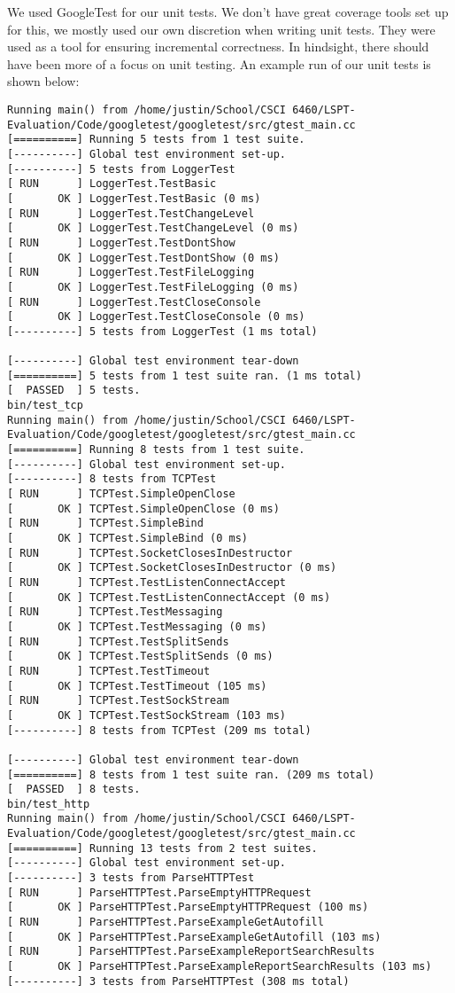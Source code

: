 We used GoogleTest for our unit tests. We don't have great coverage tools set up for this, we mostly used our own discretion when writing unit tests. They were used as a tool for ensuring incremental correctness. In hindsight, there should have been more of a focus on unit testing. An example run of our unit tests is shown below:

\footnotesize

\begin{verbatim}
Running main() from /home/justin/School/CSCI 6460/LSPT-Evaluation/Code/googletest/googletest/src/gtest_main.cc
[==========] Running 5 tests from 1 test suite.
[----------] Global test environment set-up.
[----------] 5 tests from LoggerTest
[ RUN      ] LoggerTest.TestBasic
[       OK ] LoggerTest.TestBasic (0 ms)
[ RUN      ] LoggerTest.TestChangeLevel
[       OK ] LoggerTest.TestChangeLevel (0 ms)
[ RUN      ] LoggerTest.TestDontShow
[       OK ] LoggerTest.TestDontShow (0 ms)
[ RUN      ] LoggerTest.TestFileLogging
[       OK ] LoggerTest.TestFileLogging (0 ms)
[ RUN      ] LoggerTest.TestCloseConsole
[       OK ] LoggerTest.TestCloseConsole (0 ms)
[----------] 5 tests from LoggerTest (1 ms total)

[----------] Global test environment tear-down
[==========] 5 tests from 1 test suite ran. (1 ms total)
[  PASSED  ] 5 tests.
bin/test_tcp
Running main() from /home/justin/School/CSCI 6460/LSPT-Evaluation/Code/googletest/googletest/src/gtest_main.cc
[==========] Running 8 tests from 1 test suite.
[----------] Global test environment set-up.
[----------] 8 tests from TCPTest
[ RUN      ] TCPTest.SimpleOpenClose
[       OK ] TCPTest.SimpleOpenClose (0 ms)
[ RUN      ] TCPTest.SimpleBind
[       OK ] TCPTest.SimpleBind (0 ms)
[ RUN      ] TCPTest.SocketClosesInDestructor
[       OK ] TCPTest.SocketClosesInDestructor (0 ms)
[ RUN      ] TCPTest.TestListenConnectAccept
[       OK ] TCPTest.TestListenConnectAccept (0 ms)
[ RUN      ] TCPTest.TestMessaging
[       OK ] TCPTest.TestMessaging (0 ms)
[ RUN      ] TCPTest.TestSplitSends
[       OK ] TCPTest.TestSplitSends (0 ms)
[ RUN      ] TCPTest.TestTimeout
[       OK ] TCPTest.TestTimeout (105 ms)
[ RUN      ] TCPTest.TestSockStream
[       OK ] TCPTest.TestSockStream (103 ms)
[----------] 8 tests from TCPTest (209 ms total)

[----------] Global test environment tear-down
[==========] 8 tests from 1 test suite ran. (209 ms total)
[  PASSED  ] 8 tests.
bin/test_http
Running main() from /home/justin/School/CSCI 6460/LSPT-Evaluation/Code/googletest/googletest/src/gtest_main.cc
[==========] Running 13 tests from 2 test suites.
[----------] Global test environment set-up.
[----------] 3 tests from ParseHTTPTest
[ RUN      ] ParseHTTPTest.ParseEmptyHTTPRequest
[       OK ] ParseHTTPTest.ParseEmptyHTTPRequest (100 ms)
[ RUN      ] ParseHTTPTest.ParseExampleGetAutofill
[       OK ] ParseHTTPTest.ParseExampleGetAutofill (103 ms)
[ RUN      ] ParseHTTPTest.ParseExampleReportSearchResults
[       OK ] ParseHTTPTest.ParseExampleReportSearchResults (103 ms)
[----------] 3 tests from ParseHTTPTest (308 ms total)


\end{verbatim}
